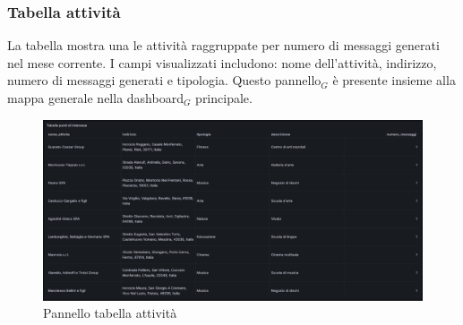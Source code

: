 \documentclass[10pt]{article}
\begin{document}
\begin{justify}
    \subsubsection{Tabella attività}
    La tabella mostra una le attività raggruppate per numero di messaggi generati nel mese corrente. I campi visualizzati includono: nome dell'attività, indirizzo, numero di messaggi generati e tipologia. Questo pannello$_G$ è presente insieme alla mappa generale nella dashboard$_G$ principale.
    \begin{figure}[H]
    \centering
    \includegraphics[width=1\linewidth]{tabella.png}
    \caption{Pannello tabella attività}
    \end{figure}
    

\end{justify}
\end{document}
